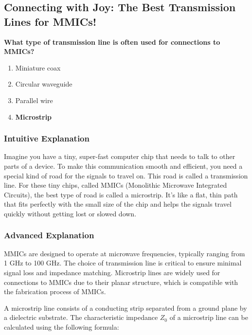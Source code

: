 \subsection{Connecting with Joy: The Best Transmission Lines for MMICs!}
\label{sec:E6E07}

\begin{tcolorbox}[colback=gray!10!white,colframe=black!75!black,title={\textbf{E6E07}}]
\textbf{What type of transmission line is often used for connections to MMICs?}
\begin{enumerate}[label=\Alph*,noitemsep]
    \item Miniature coax
    \item Circular waveguide
    \item Parallel wire
    \item \textbf{Microstrip}
\end{enumerate}
\end{tcolorbox}

\subsubsection{Intuitive Explanation}
Imagine you have a tiny, super-fast computer chip that needs to talk to other parts of a device. To make this communication smooth and efficient, you need a special kind of road for the signals to travel on. This road is called a transmission line. For these tiny chips, called MMICs (Monolithic Microwave Integrated Circuits), the best type of road is called a microstrip. It's like a flat, thin path that fits perfectly with the small size of the chip and helps the signals travel quickly without getting lost or slowed down.

\subsubsection{Advanced Explanation}
MMICs are designed to operate at microwave frequencies, typically ranging from 1 GHz to 100 GHz. The choice of transmission line is critical to ensure minimal signal loss and impedance matching. Microstrip lines are widely used for connections to MMICs due to their planar structure, which is compatible with the fabrication process of MMICs. 

A microstrip line consists of a conducting strip separated from a ground plane by a dielectric substrate. The characteristic impedance \( Z_0 \) of a microstrip line can be calculated using the following formula:

